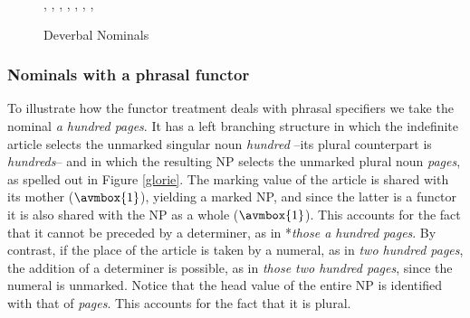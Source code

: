 \documentclass[output=paper]{langsci/langscibook}
\begin{document}
\begin{figure}
\begin{center}
\footnotesize
\tree
{,
  {,
    {}},
  {,
    {,
      {}},  
    {,
      {}}}}
\caption{\label{possy} Deverbal Nominals }
\normalsize
\end{center}
\end{figure}


        
\subsubsection{Nominals with a phrasal functor} 
\label{sec-phrasal-spec}


To illustrate how the functor treatment deals with phrasal specifiers we 
take the nominal \emph{a hundred pages}. It has a left branching structure in
which the indefinite article selects the unmarked singular noun \emph{hundred} --its plural 
counterpart is \emph{hundreds}--  
and in which the resulting NP selects the unmarked plural noun 
\emph{pages}, as spelled out in Figure \ref{glorie}. The  
{\sc marking} value of the article is shared with its mother ($\avmbox{1}$), 
yielding a marked NP, and since the latter is a functor it is also shared with 
the NP as a whole ($\avmbox{1}$). 
This accounts for the fact that it cannot be preceded by a determiner, 
as in *\emph{those a hundred pages}. By contrast, if the place of the article is taken 
by a numeral, as in \emph{two hundred pages}, the addition of a determiner is 
possible, as in \emph{those two hundred pages}, since the numeral is unmarked. 
Notice that the {\sc head} value of the entire NP is identified with that 
of \emph{pages}. This accounts for the fact that it is plural.  
 
\end{document}
